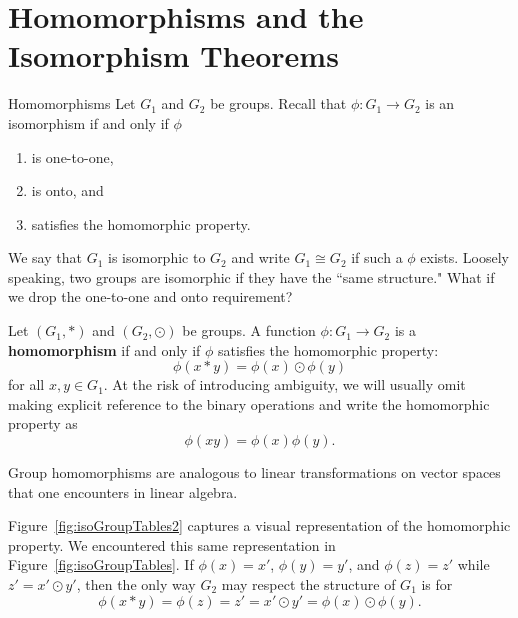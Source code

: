 \chapter{Homomorphisms and the Isomorphism Theorems}
\label{chapter:homomorphisms}
\thispagestyle{empty}

\begin{section}{Homomorphisms}
Let $G_1$ and $G_2$ be groups. Recall that $\phi:G_1\to G_2$ is an isomorphism if and only if $\phi$
\begin{enumerate}[label=\rm{(\alph*)}]
\item is one-to-one, 
\item is onto, and
\item satisfies the homomorphic property.
\end{enumerate}
We say that $G_1$ is isomorphic to $G_2$ and write $G_1\cong G_2$ if such a $\phi$ exists. Loosely speaking, two groups are isomorphic if they have the ``same structure."  What if we drop the one-to-one and onto requirement?

\begin{definition}
Let $(G_1,*)$ and $(G_2,\odot)$ be groups. A function $\phi:G_1\to G_2$ is a \textbf{homomorphism} if and only if $\phi$ satisfies the homomorphic property:
\[
\phi(x*y)=\phi(x)\odot\phi(y)
\]
for all $x,y\in G_1$. At the risk of introducing ambiguity, we will usually omit making explicit reference to the binary operations and write the homomorphic property as
\[
\phi(xy)=\phi(x)\phi(y).
\]
\end{definition}

Group homomorphisms are analogous to linear transformations on vector spaces that one encounters in linear algebra.

Figure~\ref{fig:isoGroupTables2} captures a visual representation of the homomorphic property.  We encountered this same representation in Figure~\ref{fig:isoGroupTables}. If $\phi(x)=x'$, $\phi(y)=y'$, and $\phi(z)=z'$ while $z'=x'\odot y'$, then the only way $G_2$ may respect the structure of $G_1$ is for
\[
\phi(x*y)=\phi(z)=z'=x'\odot y'=\phi(x)\odot \phi(y).
\]


\end{section}
